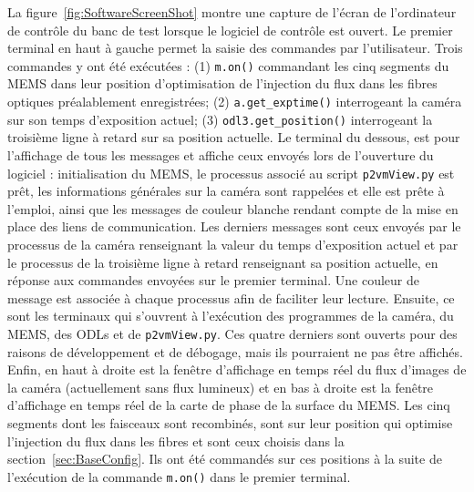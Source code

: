 La figure~\ref{fig:SoftwareScreenShot} montre une capture de l'écran de l'ordinateur de contrôle du banc de test lorsque le logiciel de contrôle est ouvert. Le premier terminal en haut à gauche permet la saisie des commandes par l'utilisateur. Trois commandes y ont été exécutées : (1) \texttt{m.on()} commandant les cinq segments du \ac{MEMS} dans leur position d'optimisation de l'injection du flux dans les fibres optiques préalablement enregistrées; (2) \texttt{a.get\_exptime()} interrogeant la caméra sur son temps d'exposition actuel; (3) \texttt{odl3.get\_position()} interrogeant la troisième ligne à retard sur sa position actuelle. Le terminal du dessous, est pour l'affichage de tous les messages et affiche ceux envoyés lors de l'ouverture du logiciel : initialisation du \ac{MEMS}, le processus associé au script \texttt{p2vmView.py} est prêt, les informations générales sur la caméra sont rappelées et elle est prête à l'emploi, ainsi que les messages de couleur blanche rendant compte de la mise en place des liens de communication. Les derniers messages sont ceux envoyés par le processus de la caméra renseignant la valeur du temps d'exposition actuel et par le processus de la troisième ligne à retard renseignant sa position actuelle, en réponse aux commandes envoyées sur le premier terminal. Une couleur de message est associée à chaque processus afin de faciliter leur lecture. Ensuite, ce sont les terminaux qui s'ouvrent à l'exécution des programmes de la caméra, du \ac{MEMS}, des \ac{ODL}s et de \texttt{p2vmView.py}. Ces quatre derniers sont ouverts pour des raisons de développement et de débogage, mais ils pourraient ne pas être affichés. Enfin, en haut à droite est la fenêtre d'affichage en temps réel du flux d'images de la caméra (actuellement sans flux lumineux) et en bas à droite est la fenêtre d'affichage en temps réel de la carte de phase de la surface du \ac{MEMS}. Les cinq segments dont les faisceaux sont recombinés, sont sur leur position qui optimise l'injection du flux dans les fibres et sont ceux choisis dans la section~\ref{sec:BaseConfig}. Ils ont été commandés sur ces positions à la suite de l'exécution de la commande \texttt{m.on()} dans le premier terminal.

